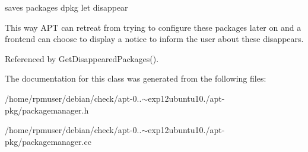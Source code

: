 saves packages dpkg let disappear 

\-This way \-A\-P\-T can retreat from trying to configure these packages later on and a frontend can choose to display a notice to inform the user about these disappears. 

\-Referenced by \-Get\-Disappeared\-Packages().



\-The documentation for this class was generated from the following files\-:\begin{DoxyCompactItemize}
\item 
/home/rpmuser/debian/check/apt-\/0..$\sim$exp12ubuntu10./apt-\/pkg/packagemanager.\-h\item 
/home/rpmuser/debian/check/apt-\/0..$\sim$exp12ubuntu10./apt-\/pkg/packagemanager.\-cc\end{DoxyCompactItemize}
